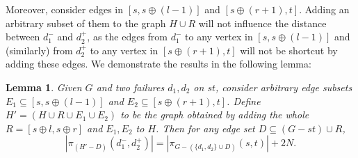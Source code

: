\documentclass[11pt]{article}
\theoremstyle{plain}
\newtheorem{lemma}[theorem]{Lemma}
\theoremstyle{definition}
\newcommand{\set}[1]{\{ #1 \}}
\newcommand{\og}[3]{\pi_{G-#3}\left(#1,#2\right)}
\begin{document}
Moreover, consider edges in $[s,s\oplus(l-1)]$ and $[s\oplus(r+1),t]$. Adding an arbitrary subset of them to the graph $H \cup R$ will not influence the distance between $d_1^-$ and $d_2^+$, as the edges from $d_1^-$ to any vertex in $[s,s\oplus(l-1)]$ and (similarly) from $d_2^+$ to any vertex in $[s\oplus(r+1),t]$ will not be shortcut by adding these edges. We demonstrate the results in the following lemma:

\begin{lemma} \label{lemma:2edge}
    Given $G$ and two failures $d_1,d_2$ on $st$, consider arbitrary edge subsets $E_1 \subseteq [s,s\oplus(l-1)]$ and $E_2 \subseteq [s\oplus(r+1),t]$. Define $H' = (H \cup R \cup E_1 \cup E_2)$ to be the graph obtained by adding the whole $R=[s \oplus l, s \oplus r]$ and $E_1,E_2$ to $H$. Then for any edge set $D \subseteq (G-st) \cup R$,
\[|\pi_{(H'-D)}(d_1^-, d_2^+)| = |\og{s}{t}{(\set{d_1, d_2}\cup D)}|+2N.\]
    
\end{lemma}
\end{document}
